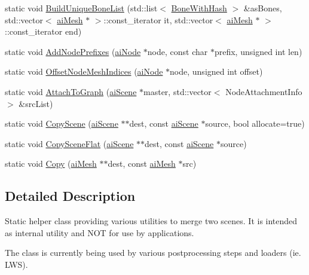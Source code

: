 \begin{CompactItemize}
\item 
static void \hyperlink{class_assimp_1_1_scene_combiner_9bfbbbab2ece2925fc3628c587ea9dcc}{BuildUniqueBoneList} (std::list$<$ \hyperlink{struct_assimp_1_1_bone_with_hash}{BoneWithHash} $>$ \&asBones, std::vector$<$ \hyperlink{structai_mesh}{aiMesh} $\ast$ $>$::const\_\-iterator it, std::vector$<$ \hyperlink{structai_mesh}{aiMesh} $\ast$ $>$::const\_\-iterator end)
\item 
static void \hyperlink{class_assimp_1_1_scene_combiner_5e4ec755bb270b894e37d20938a4a88b}{AddNodePrefixes} (\hyperlink{structai_node}{aiNode} $\ast$node, const char $\ast$prefix, unsigned int len)
\item 
static void \hyperlink{class_assimp_1_1_scene_combiner_0c52e873dfdd0c71f7f2bae06bcbb865}{OffsetNodeMeshIndices} (\hyperlink{structai_node}{aiNode} $\ast$node, unsigned int offset)
\item 
static void \hyperlink{class_assimp_1_1_scene_combiner_1672dc80009a8183edbabc4ef262b5c5}{AttachToGraph} (\hyperlink{structai_scene}{aiScene} $\ast$master, std::vector$<$ NodeAttachmentInfo $>$ \&srcList)
\item 
static void \hyperlink{class_assimp_1_1_scene_combiner_855a472e4848d737ef1ff091363f3a7c}{CopyScene} (\hyperlink{structai_scene}{aiScene} $\ast$$\ast$dest, const \hyperlink{structai_scene}{aiScene} $\ast$source, bool allocate=true)
\item 
static void \hyperlink{class_assimp_1_1_scene_combiner_fd836d513bc02da4c40d1432bf687f3e}{CopySceneFlat} (\hyperlink{structai_scene}{aiScene} $\ast$$\ast$dest, const \hyperlink{structai_scene}{aiScene} $\ast$source)
\item 
static void \hyperlink{class_assimp_1_1_scene_combiner_abed196fdfb16f82873ec811c6a64bfc}{Copy} (\hyperlink{structai_mesh}{aiMesh} $\ast$$\ast$dest, const \hyperlink{structai_mesh}{aiMesh} $\ast$src)
\end{CompactItemize}


\subsection{Detailed Description}
Static helper class providing various utilities to merge two scenes. It is intended as internal utility and NOT for use by applications. 

The class is currently being used by various postprocessing steps and loaders (ie. LWS). 


